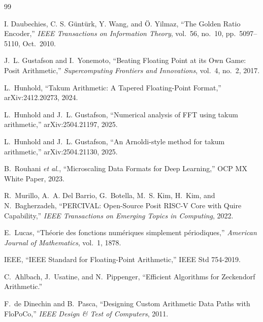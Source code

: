 \documentclass[conference]{IEEEtran}
\begin{document}
\begin{thebibliography}{99}

I. Daubechies, C. S. G\"unt\"urk, Y. Wang, and \"O. Yilmaz, ``The Golden
Ratio Encoder,'' \emph{IEEE Transactions on Information Theory},
vol.~56, no.~10, pp.~5097--5110, Oct.\ 2010.

J.~L. Gustafson and I.~Yonemoto, ``Beating Floating Point at its Own
Game: Posit Arithmetic,'' \emph{Supercomputing Frontiers and
Innovations}, vol.~4, no.~2, 2017.

L.~Hunhold, ``Takum Arithmetic: A Tapered Floating-Point Format,''
arXiv:2412.20273, 2024.

L.~Hunhold and J.~L. Gustafson, ``Numerical analysis of FFT using takum
arithmetic,'' arXiv:2504.21197, 2025.

L.~Hunhold and J.~L. Gustafson, ``An Arnoldi-style method for takum
arithmetic,'' arXiv:2504.21130, 2025.

B.~Rouhani \emph{et al.}, ``Microscaling Data Formats for Deep
Learning,'' OCP MX White Paper, 2023.

R.~Murillo, A.~A. Del Barrio, G.~Botella, M.~S. Kim, H.~Kim, and N.~Bagherzadeh,
``PERCIVAL: Open-Source Posit RISC-V Core with Quire Capability,''
\emph{IEEE Transactions on Emerging Topics in Computing}, 2022.

E.~Lucas, ``Th\'eorie des fonctions num\'eriques simplement
p\'eriodiques,'' \emph{American Journal of Mathematics}, vol.~1, 1878.

IEEE, ``IEEE Standard for Floating-Point Arithmetic,'' IEEE Std
754-2019.

C.~Ahlbach, J.~Usatine, and N.~Pippenger, ``Efficient Algorithms for
Zeckendorf Arithmetic.''

F.~de Dinechin and B.~Pasca, ``Designing Custom Arithmetic Data Paths
with FloPoCo,'' \emph{IEEE Design \& Test of Computers}, 2011.


\end{thebibliography}
\end{document}

